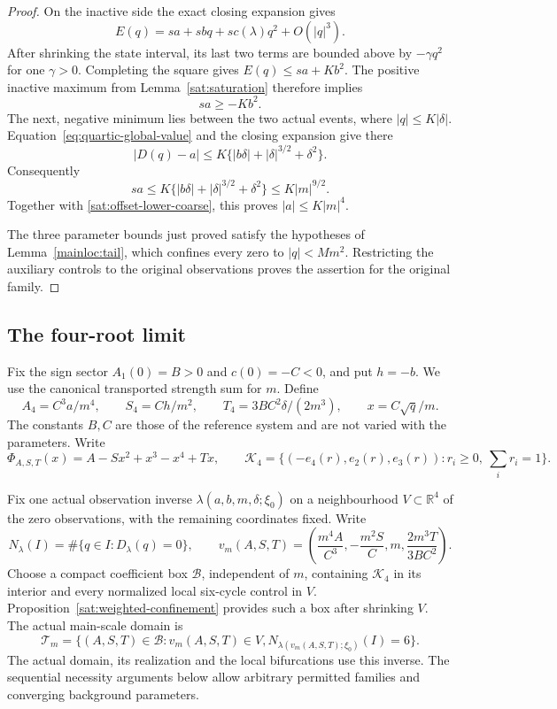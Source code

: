 \begin{proof}
On the inactive side the exact closing expansion gives
\[
 E(q)=sa+sbq+sc(\lambda)q^2+O(|q|^3).
\]
After shrinking the state interval, its last two terms are bounded
above by \(-\gamma q^2\) for one \(\gamma>0\). Completing the
square gives \(E(q)\le sa+Kb^2\). The positive inactive maximum
from Lemma~\ref{sat:saturation} therefore implies
\begin{equation}\label{sat:offset-lower-coarse}
 sa\ge-Kb^2.
\end{equation}
The next, negative minimum lies between the two actual events, where
\(|q|\le K|\delta|\). Equation~\eqref{eq:quartic-global-value} and the
closing expansion give there
\[
 |D(q)-a|\le K\{ |b\delta|+|\delta|^{3/2}+\delta^2\}.
\]
Consequently
\begin{equation}\label{sat:offset-upper-coarse}
 sa\le K\{ |b\delta|+|\delta|^{3/2}+\delta^2\}
       \le K|m|^{9/2}.
\end{equation}
Together with \eqref{sat:offset-lower-coarse}, this proves
\(|a|\le K|m|^4\).

The three parameter bounds just proved satisfy the hypotheses of
Lemma~\ref{mainloc:tail}, which confines every zero to $|q|<Mm^2$.
Restricting the auxiliary controls to the original observations proves
the assertion for the original family.
\end{proof}

\subsection{The four-root limit}

Fix the sign sector $A_1(0)=B>0$ and $c(0)=-C<0$, and put $h=-b$.
We use the canonical transported strength sum for $m$.
Define
\[
 A_4=C^3a/m^4,\qquad S_4=Ch/m^2,\qquad
 T_4=3BC^2\delta/(2m^3),\qquad x=C\sqrt q/m.
\]
The constants $B,C$ are those of the reference system and are not varied
with the parameters. Write
\[
 \Phi_{A,S,T}(x)=A-Sx^2+x^3-x^4+Tx,
 \qquad
 \mathcal K_4=\{(-e_4(r),e_2(r),e_3(r)):r_i\ge0,\ \sum_i r_i=1\}.
\]

Fix one actual observation inverse $\lambda(a,b,m,\delta;\xi_0)$ on
a neighbourhood $V\subset\mathbb R^4$ of the zero observations, with
the remaining coordinates fixed. Write
\[
 N_\lambda(I)=\#\{q\in I:D_\lambda(q)=0\},\qquad
 v_m(A,S,T)=\left(\frac{m^4A}{C^3},-\frac{m^2S}{C},m,
                         \frac{2m^3T}{3BC^2}\right).
\]
Choose a compact coefficient box $\mathcal B$, independent of $m$,
containing $\mathcal K_4$ in its interior and every normalized local
six-cycle control in $V$. Proposition~\ref{sat:weighted-confinement}
provides such a box after shrinking $V$. The actual main-scale domain is
\begin{equation}\label{def:actual-main-domain}
 \mathscr T_m=\{(A,S,T)\in\mathcal B:v_m(A,S,T)\in V,
                    N_{\lambda(v_m(A,S,T);\xi_0)}(I)=6\}.
\end{equation}
The actual domain, its realization and the local bifurcations use this
inverse. The sequential necessity arguments below allow arbitrary
permitted families and converging background parameters.

